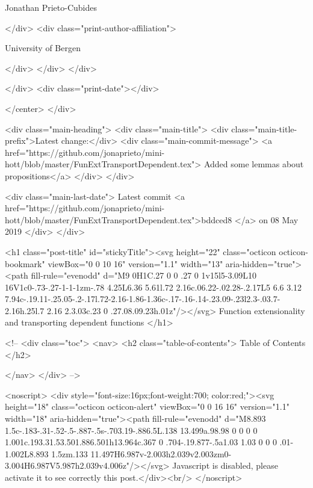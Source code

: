                  Jonathan Prieto-Cubides
                
              </div>
              <div class="print-author-affiliation">
                
                  University of Bergen
                
                </div>
            </div>
          </div>
          
          
        </div>
        <div class="print-date"></div>
        
        
    </center>
  </div>

  
  <div class="main-heading">
    <div class="main-title">
      <div class="main-title-prefix">Latest change:</div>
      <div class="main-commit-message">
            <a href="https://github.com/jonaprieto/mini-hott/blob/master/FunExtTransportDependent.tex">
              Added some lemmas about propositions</a>
      </div>
    </div>

    <div class="main-last-date">
      Latest commit <a href="https://github.com/jonaprieto/mini-hott/blob/master/FunExtTransportDependent.tex">bddced8 </a> on  08 May 2019
    </div>
  </div>
  
  <h1 class="post-title" id="stickyTitle"><svg height="22" class="octicon octicon-bookmark" viewBox="0 0 10 16" version="1.1" width="13" aria-hidden="true"><path fill-rule="evenodd" d="M9 0H1C.27 0 0 .27 0 1v15l5-3.09L10 16V1c0-.73-.27-1-1-1zm-.78 4.25L6.36 5.61l.72 2.16c.06.22-.02.28-.2.17L5 6.6 3.12 7.94c-.19.11-.25.05-.2-.17l.72-2.16-1.86-1.36c-.17-.16-.14-.23.09-.23l2.3-.03.7-2.16h.25l.7 2.16 2.3.03c.23 0 .27.08.09.23h.01z"/></svg> Function extensionality and transporting dependent functions 
  </h1>

  <!-- 
  <div class="toc">
    <nav>
    <h2 class="table-of-contents"> Table of Contents </h2>
      

    </nav>
  </div>
   -->

  <noscript>
  <div style="font-size:16px;font-weight:700; color:red;"><svg height="18" class="octicon octicon-alert" viewBox="0 0 16 16" version="1.1" width="18" aria-hidden="true"><path fill-rule="evenodd" d="M8.893 1.5c-.183-.31-.52-.5-.887-.5s-.703.19-.886.5L.138 13.499a.98.98 0 0 0 0 1.001c.193.31.53.501.886.501h13.964c.367 0 .704-.19.877-.5a1.03 1.03 0 0 0 .01-1.002L8.893 1.5zm.133 11.497H6.987v-2.003h2.039v2.003zm0-3.004H6.987V5.987h2.039v4.006z"/></svg> Javascript is disabled, please activate it to see correctly this post.</div><br/>
  </noscript>

